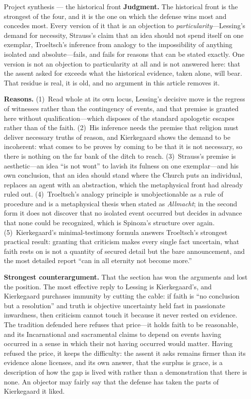 \begin{studybox}{Project synthesis --- the historical front}
\textbf{Judgment.} The historical front is the strongest of the four, and it is the one on which the defense wins most and concedes most. Every version of it that is an objection to \emph{particularity}---Lessing's demand for necessity, Strauss's claim that an idea should not spend itself on one exemplar, Troeltsch's inference from analogy to the impossibility of anything isolated and absolute---fails, and fails for reasons that can be stated exactly. One version is not an objection to particularity at all and is not answered here: that the assent asked for exceeds what the historical evidence, taken alone, will bear. That residue is real, it is old, and no argument in this article removes it.

\textbf{Reasons.} (1)~Read whole at its own locus, Lessing's decisive move is the regress of witnesses rather than the contingency of events, and that premise is granted here without qualification---which disposes of the standard apologetic escapes rather than of the faith. (2)~His inference needs the premise that religion must deliver necessary truths of reason, and Kierkegaard shows the demand to be incoherent: what comes to be proves by coming to be that it is not necessary, so there is nothing on the far bank of the ditch to reach. (3)~Strauss's premise is aesthetic---an idea ``is not wont'' to lavish its fulness on one exemplar---and his own conclusion, that an idea should stand where the Church puts an individual, replaces an agent with an abstraction, which the metaphysical front had already ruled out. (4)~Troeltsch's analogy principle is unobjectionable as a rule of procedure and is a metaphysical thesis when stated as \emph{Allmacht}; in the second form it does not discover that no isolated event occurred but decides in advance that none could be recognized, which is Spinoza's structure over again. (5)~Kierkegaard's minimal-testimony formula answers Troeltsch's strongest practical result: granting that criticism makes every single fact uncertain, what faith rests on is not a quantity of secured detail but the bare announcement, and the most detailed report ``can in all eternity not become more.''

\textbf{Strongest counterargument.} That the section has won the arguments and lost the position. The most effective reply to Lessing is Kierkegaard's, and Kierkegaard purchases immunity by cutting the cable: if faith is ``no conclusion but a resolution'' and truth is objective uncertainty held fast in passionate inwardness, then criticism cannot touch it because it never rested on evidence. The tradition defended here refuses that price---it holds faith to be reasonable, and its Incarnational and sacramental claims to depend on events having occurred in a sense in which their not having occurred would matter. Having refused the price, it keeps the difficulty: the assent it asks remains firmer than its evidence alone licenses, and its own answer, that the surplus is grace, is a description of how the gap is lived with rather than a demonstration that there is none. An objector may fairly say that the defense has taken the parts of Kierkegaard it liked.


\end{studybox}
